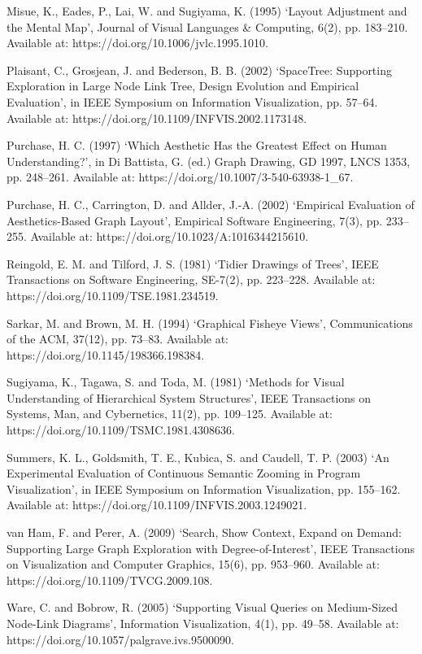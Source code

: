 \documentclass[11pt,a4paper,oneside,extrafontsizes]{memoir}
\begin{document}
Misue, K., Eades, P., Lai, W. and Sugiyama, K. (1995) ‘Layout Adjustment and the Mental Map’, Journal of Visual Languages \& Computing, 6(2), pp. 183–210. Available at: https://doi.org/10.1006/jvlc.1995.1010.

Plaisant, C., Grosjean, J. and Bederson, B. B. (2002) ‘SpaceTree: Supporting Exploration in Large Node Link Tree, Design Evolution and Empirical Evaluation’, in IEEE Symposium on Information Visualization, pp. 57–64. Available at: https://doi.org/10.1109/INFVIS.2002.1173148.

Purchase, H. C. (1997) ‘Which Aesthetic Has the Greatest Effect on Human Understanding?’, in Di Battista, G. (ed.) Graph Drawing, GD 1997, LNCS 1353, pp. 248–261. Available at: https://doi.org/10.1007/3-540-63938-1\_67.

Purchase, H. C., Carrington, D. and Allder, J.-A. (2002) ‘Empirical Evaluation of Aesthetics-Based Graph Layout’, Empirical Software Engineering, 7(3), pp. 233–255. Available at: https://doi.org/10.1023/A:1016344215610.

Reingold, E. M. and Tilford, J. S. (1981) ‘Tidier Drawings of Trees’, IEEE Transactions on Software Engineering, SE-7(2), pp. 223–228. Available at: https://doi.org/10.1109/TSE.1981.234519.

Sarkar, M. and Brown, M. H. (1994) ‘Graphical Fisheye Views’, Communications of the ACM, 37(12), pp. 73–83. Available at: https://doi.org/10.1145/198366.198384.

Sugiyama, K., Tagawa, S. and Toda, M. (1981) ‘Methods for Visual Understanding of Hierarchical System Structures’, IEEE Transactions on Systems, Man, and Cybernetics, 11(2), pp. 109–125. Available at: https://doi.org/10.1109/TSMC.1981.4308636.

Summers, K. L., Goldsmith, T. E., Kubica, S. and Caudell, T. P. (2003) ‘An Experimental Evaluation of Continuous Semantic Zooming in Program Visualization’, in IEEE Symposium on Information Visualization, pp. 155–162. Available at: https://doi.org/10.1109/INFVIS.2003.1249021.

van Ham, F. and Perer, A. (2009) ‘Search, Show Context, Expand on Demand: Supporting Large Graph Exploration with Degree-of-Interest’, IEEE Transactions on Visualization and Computer Graphics, 15(6), pp. 953–960. Available at: https://doi.org/10.1109/TVCG.2009.108.

Ware, C. and Bobrow, R. (2005) ‘Supporting Visual Queries on Medium-Sized Node-Link Diagrams’, Information Visualization, 4(1), pp. 49–58. Available at: https://doi.org/10.1057/palgrave.ivs.9500090.
\end{document}
